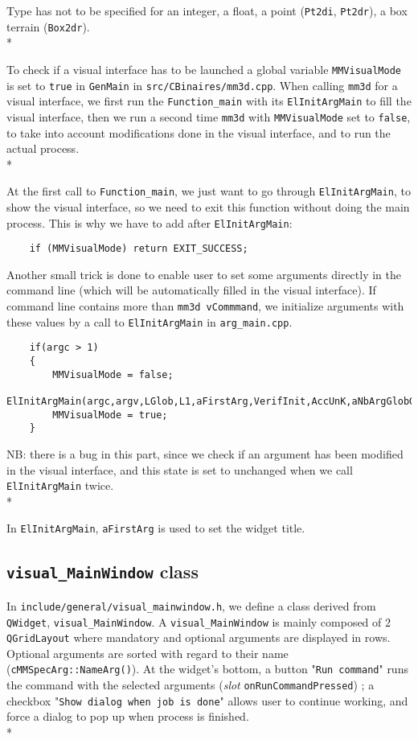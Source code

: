 \documentclass[a4paper]{book}
\begin{document}
Type has not to be specified for an integer, a float, a point ({\tt Pt2di}, {\tt Pt2dr}), a box terrain ({\tt Box2dr}).\\*

To check if a visual interface has to be launched a global variable {\tt MMVisualMode} is set to {\tt true} in {\tt GenMain} in {\tt src/CBinaires/mm3d.cpp}. When calling {\tt mm3d} for a visual interface, we first run the {\tt Function\_main} with its {\tt ElInitArgMain} to fill the visual interface, then we run a second time {\tt mm3d} with {\tt MMVisualMode} set to {\tt false}, to take into account modifications done in the visual interface, and to run the actual process.\\*

At the first call to {\tt Function\_main}, we just want to go through {\tt ElInitArgMain}, to show the visual interface, so we need to exit this function without doing the main process. This is why we have to add after {\tt ElInitArgMain}:

\begin{verbatim}           
    if (MMVisualMode) return EXIT_SUCCESS;
\end{verbatim}

Another small trick is done to enable user to set some arguments directly in the command line (which will be automatically filled in the visual interface). If command line contains more than {\tt mm3d vCommmand}, we initialize arguments with these values by a call to {\tt ElInitArgMain} in {\tt arg\_main.cpp}.

\begin{verbatim} 
    if(argc > 1)
    {
    	MMVisualMode = false;
    	ElInitArgMain(argc,argv,LGlob,L1,aFirstArg,VerifInit,AccUnK,aNbArgGlobGlob);
    	MMVisualMode = true;
    }
\end{verbatim}
        
NB: there is a bug in this part, since we check if an argument has been modified in the visual interface, and this state is set to unchanged when we call {\tt ElInitArgMain} twice.\\*

In {\tt ElInitArgMain}, {\tt aFirstArg} is used to set the widget title.

\subsection{{\tt visual\_MainWindow} class}

In {\tt include/general/visual\_mainwindow.h}, we define a class derived from {\tt QWidget}, {\tt visual\_MainWindow}. A {\tt visual\_MainWindow} is mainly composed of 2 {\tt QGridLayout} where mandatory and optional arguments are displayed in rows. Optional arguments are sorted with regard to their name ({\tt cMMSpecArg::NameArg()}). At the widget's bottom, a button "{\tt Run command}" runs the command with the selected arguments (\textit{slot} {\tt onRunCommandPressed}) ; a checkbox "{\tt Show dialog when job is done}" allows user to continue working, and force a dialog to pop up when process is finished.\\*
\end{document}
